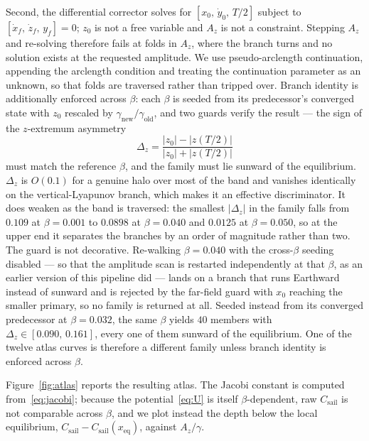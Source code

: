 \documentclass[11pt,a4paper]{article}
\begin{document}
Second, the differential corrector solves for $[x_0,\,\dot y_0,\,T/2]$ subject
to $[\dot x_f,\,\dot z_f,\,y_f]=0$; $z_0$ is not a free variable and $A_z$ is
not a constraint. Stepping $A_z$ and re-solving therefore fails at folds in
$A_z$, where the branch turns and no solution exists at the requested
amplitude. We use pseudo-arclength continuation, appending the arclength
condition and treating the continuation parameter as an unknown, so that folds
are traversed rather than tripped over. Branch identity is additionally
enforced across $\beta$: each $\beta$ is seeded from its predecessor's converged
state with $z_0$ rescaled by $\gamma_{\mathrm{new}}/\gamma_{\mathrm{old}}$, and
two guards verify the result --- the sign of the $z$-extremum asymmetry
\begin{equation}
  \Delta_z = \frac{\lvert z_0\rvert - \lvert z(T/2)\rvert}
                  {\lvert z_0\rvert + \lvert z(T/2)\rvert}
\end{equation}
must match the reference $\beta$, and the family must lie sunward of the
equilibrium. $\Delta_z$ is $O(0.1)$ for a genuine halo over most of the band and
vanishes identically on the vertical-Lyapunov branch, which makes it an
effective discriminator. It does weaken as the band is traversed: the smallest
$\lvert\Delta_z\rvert$ in the family falls from $0.109$ at $\beta=0.001$ to
$0.0898$ at $\beta=0.040$ and $0.0125$ at $\beta=0.050$, so at the upper end it
separates the branches by an order of magnitude rather than two.
The guard is not decorative. Re-walking $\beta=0.040$ with the cross-$\beta$
seeding disabled --- so that the amplitude scan is restarted independently at
that $\beta$, as an earlier version of this pipeline did --- lands on a branch
that runs Earthward instead of sunward and is rejected by the far-field guard
with $x_0$ reaching the smaller primary, so no family is returned at all.
Seeded instead from its converged predecessor at $\beta=0.032$, the same
$\beta$ yields $40$ members with $\Delta_z\in[0.090,\,0.161]$, every one of them
sunward of the equilibrium. One of the twelve atlas curves is therefore a
different family unless branch identity is enforced across $\beta$.

Figure~\ref{fig:atlas} reports the resulting atlas. The Jacobi constant is
computed from~\eqref{eq:jacobi}; because the potential~\eqref{eq:U} is itself
$\beta$-dependent, raw $C_{\mathrm{sail}}$ is not comparable across $\beta$, and
we plot instead the depth below the local equilibrium,
$C_{\mathrm{sail}}-C_{\mathrm{sail}}(x_{\mathrm{eq}})$, against $A_z/\gamma$.
\end{document}
